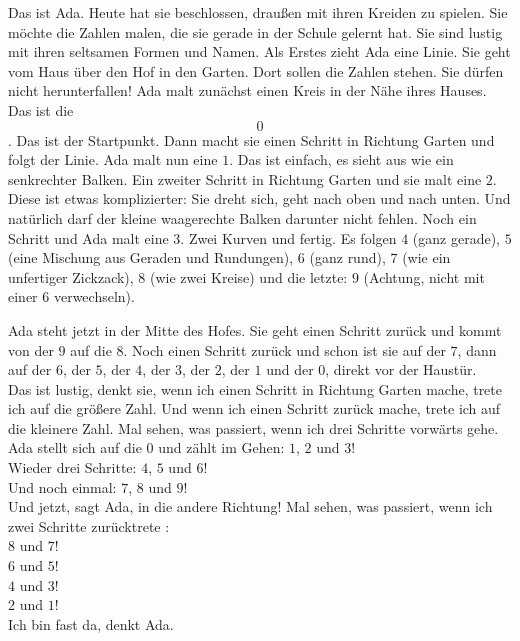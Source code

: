Das ist Ada. Heute hat sie beschlossen, draußen mit ihren Kreiden zu spielen. 
Sie möchte die Zahlen malen, die sie gerade in der Schule gelernt hat. Sie sind lustig mit ihren seltsamen Formen und Namen.
Als Erstes zieht Ada eine Linie. Sie geht vom Haus über den Hof in den Garten.
Dort sollen die Zahlen stehen. Sie dürfen nicht herunterfallen! 
Ada malt zunächst einen Kreis in der Nähe ihres Hauses. Das ist die $$0$$. Das ist der Startpunkt. 
Dann macht sie einen Schritt in Richtung Garten und folgt der Linie. Ada malt nun eine $1$. Das ist einfach, es sieht aus wie ein senkrechter Balken. 
Ein zweiter Schritt in Richtung Garten und sie malt eine $2$. Diese ist etwas komplizierter: Sie dreht sich, geht nach oben und nach unten. Und natürlich darf der kleine waagerechte Balken darunter nicht fehlen.
Noch ein Schritt und Ada malt eine $3$. Zwei Kurven und fertig.
Es folgen $4$ (ganz gerade), $5$ (eine Mischung aus Geraden und Rundungen), $6$ (ganz rund), $7$ (wie ein unfertiger Zickzack), $8$ (wie zwei Kreise) und die letzte: $9$ (Achtung, nicht mit einer $6$ verwechseln). 

Ada steht jetzt in der Mitte des Hofes. Sie geht einen Schritt zurück und kommt von der $9$ auf die $8$. Noch einen Schritt zurück und schon ist sie auf der $7$, dann auf der $6$, der $5$, der $4$, der $3$, der $2$, der $1$ und der $0$, direkt vor der Haustür.\\ 
\frqq{}Das ist lustig\flqq{}, denkt sie, \frqq{}wenn ich einen Schritt in Richtung Garten mache, trete ich auf die größere Zahl. Und wenn ich einen Schritt zurück mache, trete ich auf die kleinere Zahl. 
Mal sehen, was passiert, wenn ich drei Schritte vorwärts gehe.\flqq{}\\
Ada stellt sich auf die $0$ und zählt im Gehen: \frqq{}$1$, $2$ und $3$!\flqq{}\\
Wieder drei Schritte: \frqq{}$4$, $5$ und $6$!\flqq{}\\
Und noch einmal: \frqq{}$7$, $8$ und $9$!\flqq{}\\
\frqq{}Und jetzt\flqq{}, sagt Ada, \frqq{}in die andere Richtung!\flqq{} Mal sehen, was passiert, wenn ich zwei Schritte zurücktrete : \\
\frqq{}$8$ und $7$!\flqq{}\\ 
\frqq{}$6$ und $5$!\flqq{}\\ 
\frqq{}$4$ und $3$!\flqq{}\\ 
\frqq{}$2$ und $1$!\flqq{}\\
\frqq{}Ich bin fast da\flqq{}, denkt Ada.
